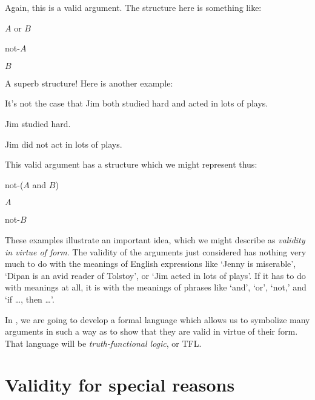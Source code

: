 Again, this is a valid argument. The structure here is something like:
	\begin{earg}
		\item[] $A$ or $B$
		\item[] not-$A$
		\item[\texttherefore] $B$
	\end{earg}
A superb structure! Here is another example:
	\begin{earg}
		\item[] It's not the case that Jim both studied hard and acted in lots of plays.
		\item[] Jim studied hard.
		\item[\texttherefore] Jim did not act in lots of plays.
	\end{earg}
This valid argument has a structure which we might represent thus:
	\begin{earg}
		\item[] not-($A$ and $B$)
		\item[] $A$
		\item[\texttherefore] not-$B$
	\end{earg}
These examples illustrate an important idea, which we might describe as \emph{validity in virtue of form}. The validity of the arguments just considered has nothing very much to do with the meanings of English expressions like `Jenny is miserable', `Dipan is an avid reader of Tolstoy', or `Jim acted in lots of plays'. If it has to do with meanings at all, it is with the meanings of phrases like `and', `or', `not,' and `if \ldots, then \ldots'.

In , we are going to develop a formal language which allows us to symbolize many arguments in such a way as to show that they are valid in virtue of their form. That language will be \emph{truth-functional logic}, or TFL.

\section{Validity for special reasons}

